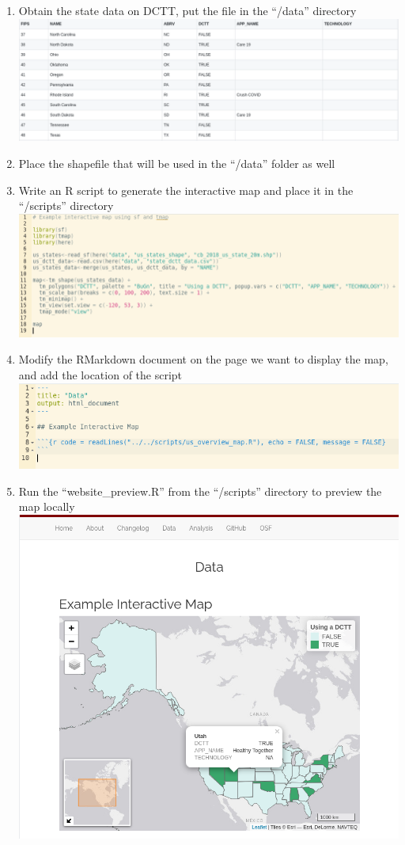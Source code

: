 \documentclass[
]{book}
\providecommand{\tightlist}{%
  \setlength{\itemsep}{0pt}\setlength{\parskip}{0pt}}
\begin{document}
\begin{enumerate}
\def\labelenumi{\arabic{enumi}.}
\tightlist
\item
  Obtain the state data on DCTT, put the file in the ``/data'' directory
  \includegraphics{images/04-example2_1.png}
\item
  Place the shapefile that will be used in the ``/data'' folder as well
\item
  Write an R script to generate the interactive map and place it in the ``/scripts'' directory
  \includegraphics{images/04-example2_2.png}
\item
  Modify the RMarkdown document on the page we want to display the map, and add the location of the script
  \includegraphics{images/04-example2_3.png}
\item
  Run the ``website\_preview.R'' from the ``/scripts'' directory to preview the map locally
  \includegraphics{images/04-example2_4.png}

\end{enumerate}
\end{document}
